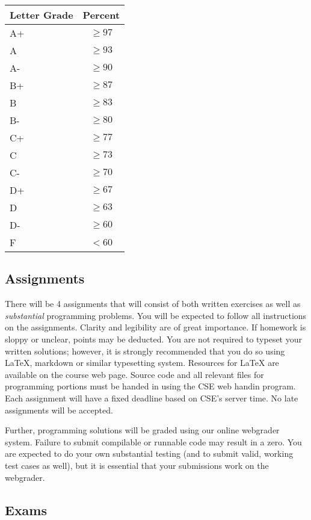 \documentclass[12pt]{scrartcl}
\begin{document}
\begin{table}[h]
\centering
\begin{tabular}{p{1cm}c}
Letter Grade & Percent \\
\hline\hline
A+ & $\geq 97$ \\
A  & $\geq 93$ \\
A- & $\geq 90$ \\
B+ & $\geq 87$ \\
B  & $\geq 83$ \\
B- & $\geq 80$ \\
C+ & $\geq 77$ \\
C  & $\geq 73$ \\
C- & $\geq 70$ \\
D+ & $\geq 67$ \\
D  & $\geq 63$ \\
D- & $\geq 60$ \\
F  & $<60$ \\
\end{tabular}
\end{table}

\subsection{Assignments}

There will be 4 assignments that will consist of both written 
exercises as well as \emph{substantial} programming problems.
You will be expected to follow all instructions on the 
assignments. Clarity and legibility are of great importance. 
If homework is sloppy or unclear, points may be deducted. You 
are not required to typeset your written solutions; however, 
it is strongly recommended that you do so using \LaTeX, 
markdown or similar typesetting system. Resources for \LaTeX 
are available on the course web page. Source code and all 
relevant files for programming portions must be handed in 
using the CSE web handin program.  Each assignment will 
have a fixed deadline based on CSE's server time.  No late
assignments will be accepted. 

Further, programming solutions will be graded using our online
webgrader system.  Failure to submit compilable or runnable 
code may result in a zero.  You are expected to do your own
substantial testing (and to submit valid, working test cases
as well), but it is essential that your submissions work on
the webgrader.

\subsection{Exams}
\end{document}
